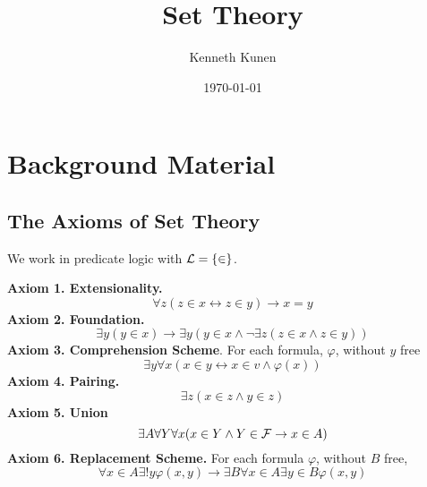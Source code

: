 \documentclass[11pt]{article}
\author{Kenneth Kunen}
\date{\today}
\title{Set Theory}
\begin{document}
\maketitle
\tableofcontents


\section{Background Material}
\label{sec:org887b8f5}
\subsection{The Axioms of Set Theory}
\label{sec:orgfd5cbb7}
We work in predicate logic with \(\mathcal{L}=\{\in\}\).

\textbf{Axiom 1. Extensionality.}
\begin{equation*}
\forall z(z\in x\leftrightarrow z\in y)\to x=y
\end{equation*}
\textbf{Axiom 2. Foundation.}
\begin{equation*}
\exists y(y\in x)\to\exists y(y\in x\wedge\neg\exists z(z\in x\wedge z\in y))
\end{equation*}
\textbf{Axiom 3. Comprehension Scheme}. For each formula, \(\varphi\), without \(y\) free
\begin{equation*}
\exists y\forall x(x\in y\leftrightarrow x\in v\wedge \varphi(x))
\end{equation*}
\textbf{Axiom 4. Pairing.}
\begin{equation*}
\exists z(x\in z\wedge y\in z)
\end{equation*}
\textbf{Axiom 5. Union}
\begin{equation*}
\exists A\forall Y\forall x(x\in Y\wedge Y\in\mathcal{F}\to x\in A)
\end{equation*}
\textbf{Axiom 6. Replacement Scheme.} For each formula \(\varphi\), without \(B\) free,
\begin{equation*}
\forall x\in A\exists!y\varphi(x,y)\to\exists B\forall x\in A\exists y\in B\varphi(x,y)
\end{equation*}
\end{document}
